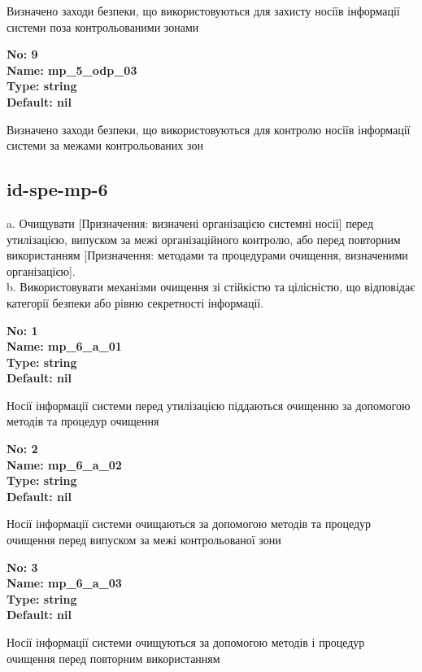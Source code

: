 \documentclass{article}
\begin{document}
{\footnotesize Визначено заходи безпеки, що використовуються для захисту носіїв інформації системи поза контрольованими зонами}


{\footnotesize\bfseries
No: 9\\
Name: mp\_\allowbreak{}5\_\allowbreak{}odp\_\allowbreak{}03\\
Type: string\\
Default: nil
}

{\footnotesize Визначено заходи безпеки, що використовуються для контролю носіїв інформації системи за межами контрольованих зон}




\subsection{id-spe-mp-6}
a. Очищувати [Призначення: визначені організацією системні носії] перед утилізацією, випуском за межі організаційного контролю, або перед повторним використанням [Призначення: методами та процедурами очищення, визначеними організацією].\\ 
b. Використовувати механізми очищення зі стійкістю та цілісністю, що відповідає категорії безпеки або рівню секретності інформації.

\vspace{10pt}
{\footnotesize\bfseries
No: 1\\
Name: mp\_\allowbreak{}6\_\allowbreak{}a\_\allowbreak{}01\\
Type: string\\
Default: nil
}

{\footnotesize Носії інформації системи перед утилізацією піддаються очищенню за допомогою методів та процедур очищення}


{\footnotesize\bfseries
No: 2\\
Name: mp\_\allowbreak{}6\_\allowbreak{}a\_\allowbreak{}02\\
Type: string\\
Default: nil
}

{\footnotesize Носії інформації системи очищаються за допомогою методів та процедур очищення перед випуском за межі контрольованої зони}


{\footnotesize\bfseries
No: 3\\
Name: mp\_\allowbreak{}6\_\allowbreak{}a\_\allowbreak{}03\\
Type: string\\
Default: nil
}

{\footnotesize Носії інформації системи очищуються за допомогою методів і процедур очищення перед повторним використанням}
\end{document}
